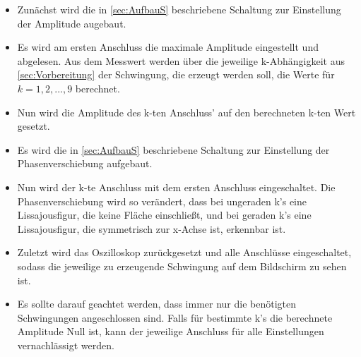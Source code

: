 \begin{itemize}

  \item Zunächst wird die in \ref{sec:AufbauS} beschriebene Schaltung zur
  Einstellung der Amplitude augebaut.

  \item Es wird am ersten Anschluss die maximale Amplitude eingestellt und
  abgelesen. Aus dem Messwert werden über die jeweilige k-Abhängigkeit aus
  \ref{sec:Vorbereitung} der
  Schwingung, die erzeugt werden soll, die Werte für $k=1,2,...,9$ berechnet.

  \item Nun wird die Amplitude des k-ten Anschluss' auf den berechneten k-ten
  Wert gesetzt.

  \item Es wird die in \ref{sec:AufbauS} beschriebene Schaltung zur Einstellung
  der Phasenverschiebung aufgebaut.

  \item Nun wird der k-te Anschluss mit dem ersten Anschluss eingeschaltet.
  Die Phasenverschiebung wird so verändert, dass bei ungeraden k's eine
  Lissajousfigur, die keine Fläche einschließt, und bei geraden k's
  eine Lissajousfigur, die symmetrisch zur x-Achse ist, erkennbar ist.

  \item Zuletzt wird das Oszilloskop zurückgesetzt und alle Anschlüsse
  eingeschaltet, sodass die jeweilige zu erzeugende Schwingung auf dem
  Bildschirm zu sehen ist.

  \item Es sollte darauf geachtet werden, dass immer nur die benötigten
  Schwingungen angeschlossen sind. Falls für bestimmte k's die berechnete
  Amplitude Null ist, kann der jeweilige Anschluss für alle Einstellungen
  vernachlässigt werden.

\end{itemize}

